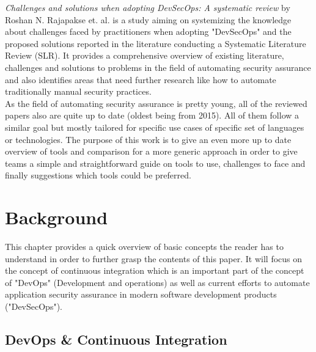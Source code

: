 \documentclass[conference]{IEEEtran}
\begin{document}
\noindent
\textit{Challenges and solutions when adopting DevSecOps: A systematic review} \cite{relatedpaper6} by Roshan N. Rajapakse et. al. is a study aiming on systemizing the knowledge about challenges faced by practitioners when adopting "DevSecOps" and the proposed solutions reported in the literature conducting a Systematic Literature Review (SLR). It provides a comprehensive overview of existing literature, challenges and solutions to problems in the field of automating security assurance and also identifies areas that need further research like how to automate traditionally manual security practices.\\

As the field of automating security assurance is pretty young, all of the reviewed papers also are quite up to date (oldest being from 2015). All of them follow a similar goal but mostly tailored for specific use cases of specific set of languages or technologies. The purpose of this work is to give an even more up to date overview of tools and comparison for a more generic approach in order to give teams a simple and straightforward guide on tools to use, challenges to face and finally suggestions which tools could be preferred.


\section{Background}

This chapter provides a quick overview of basic concepts the reader has to understand in order to further grasp the contents of this paper. It will focus on the concept of continuous integration which is an important part of the concept of "DevOps" (Development and operations) as well as current efforts to automate application security assurance in modern software development products ("DevSecOps").

\subsection{DevOps \& Continuous Integration}
\end{document}
